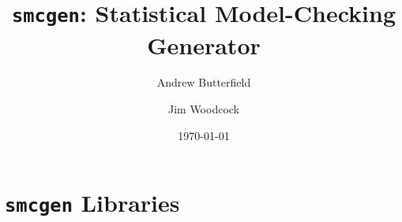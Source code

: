 \documentclass[fleqn,10pt]{report}
\author{
Andrew Butterfield \and Jim Woodcock
}
\title{
  \texttt{smcgen}:
  Statistical Model-Checking Generator
}
\date{
\today
}
\begin{document}
\maketitle
\tableofcontents
%
%
% 
%
\chapter{\texttt{smcgen} Libraries}
%
% 
\newpage

%
%
% 
%
%
%
%
% 
%
% 
%
% 
% 
\end{document}
